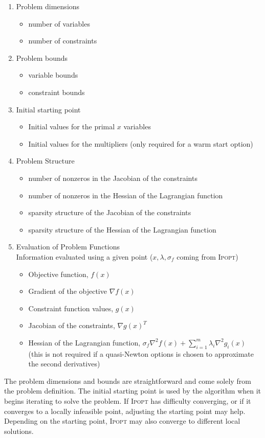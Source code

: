\documentclass[10pt]{article}
\newcommand{\Ipopt}{\textsc{Ipopt}\xspace}
\begin{document}
\begin{enumerate}
\item Problem dimensions \label{it.prob_dim}
  \begin{itemize}
  \item number of variables
  \item number of constraints
  \end{itemize}
\item Problem bounds
  \begin{itemize}
  \item variable bounds
  \item constraint bounds
  \end{itemize}
\item Initial starting point
  \begin{itemize}
  \item Initial values for the primal $x$ variables
  \item Initial values for the multipliers (only
    required for a warm start option)
  \end{itemize}
\item Problem Structure \label{it.prob_struct}
  \begin{itemize}
  \item number of nonzeros in the Jacobian of the constraints
  \item number of nonzeros in the Hessian of the Lagrangian function
  \item sparsity structure of the Jacobian of the constraints
  \item sparsity structure of the Hessian of the Lagrangian function
  \end{itemize}
\item Evaluation of Problem Functions \label{it.prob_eval} \\
  Information evaluated using a given point ($x,
  \lambda, \sigma_f$ coming from \Ipopt)
  \begin{itemize}
  \item Objective function, $f(x)$
  \item Gradient of the objective $\nabla f(x)$
  \item Constraint function values, $g(x)$
  \item Jacobian of the constraints, $\nabla g(x)^T$
  \item Hessian of the Lagrangian function, 
    $\sigma_f \nabla^2 f(x) + \sum_{i=1}^m\lambda_i\nabla^2
    g_i(x)$ \\
    (this is not required if a quasi-Newton options is chosen to
    approximate the second derivatives)
  \end{itemize}
\end{enumerate}
The problem dimensions and bounds are
straightforward and come solely from the problem definition. The
initial starting point is used by the algorithm when it begins
iterating to solve the problem. If \Ipopt has difficulty converging, or
if it converges to a locally infeasible point, adjusting the starting
point may help.  Depending on the starting point, \Ipopt may also
converge to different local solutions.
\end{document}
